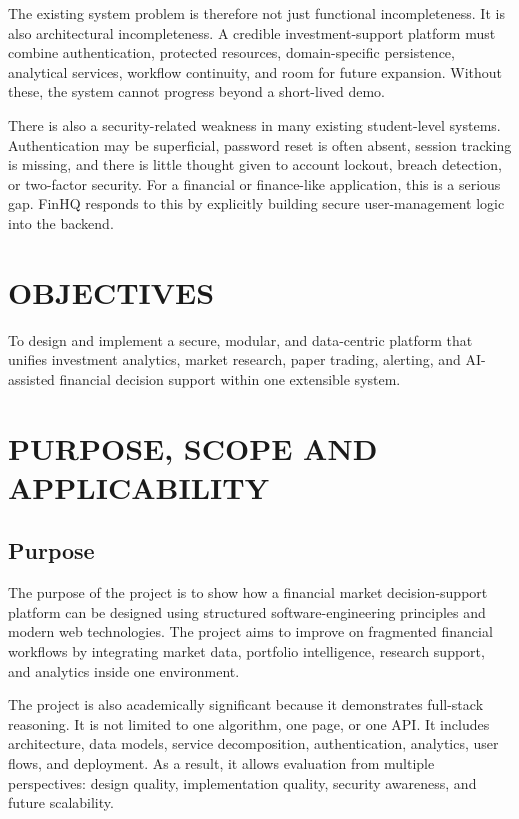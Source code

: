 \documentclass[12pt,a4paper]{report}
\newcommand{\projectshort}{FinHQ}
\begin{document}
The existing system problem is therefore not just functional incompleteness. It is also architectural incompleteness. A credible investment-support platform must combine authentication, protected resources, domain-specific persistence, analytical services, workflow continuity, and room for future expansion. Without these, the system cannot progress beyond a short-lived demo.

There is also a security-related weakness in many existing student-level systems. Authentication may be superficial, password reset is often absent, session tracking is missing, and there is little thought given to account lockout, breach detection, or two-factor security. For a financial or finance-like application, this is a serious gap. \projectshort{} responds to this by explicitly building secure user-management logic into the backend.

\section{OBJECTIVES}
To design and implement a secure, modular, and data-centric platform that unifies investment analytics, market research, paper trading, alerting, and AI-assisted financial decision support within one extensible system.

\section{PURPOSE, SCOPE AND APPLICABILITY}
\subsection{Purpose}
The purpose of the project is to show how a financial market decision-support platform can be designed using structured software-engineering principles and modern web technologies. The project aims to improve on fragmented financial workflows by integrating market data, portfolio intelligence, research support, and analytics inside one environment.

The project is also academically significant because it demonstrates full-stack reasoning. It is not limited to one algorithm, one page, or one API. It includes architecture, data models, service decomposition, authentication, analytics, user flows, and deployment. As a result, it allows evaluation from multiple perspectives: design quality, implementation quality, security awareness, and future scalability.
\end{document}
